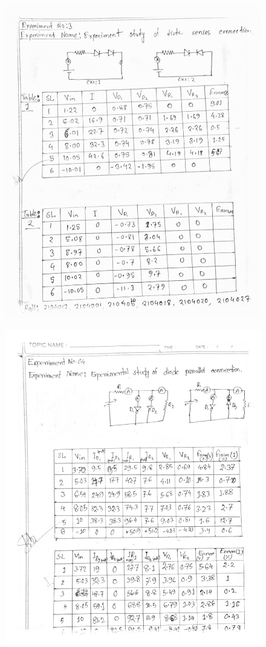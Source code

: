 \begin{figure}[H]
    \centering
    \includegraphics[scale=0.6]{src/exp03/r1.jpg}

    \caption{}
\end{figure}
\newpage

\begin{figure}[H]
    \centering
    \includegraphics[scale=0.6]{src/exp03/r2.jpg}

    \caption{}
\end{figure}